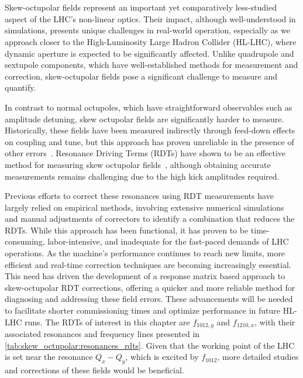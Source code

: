 \section{}

Skew-octupolar fields represent an important yet comparatively less-studied aspect of the LHC's
non-linear optics. Their impact, although well-understood in simulations, presents unique challenges
in real-world operation, especially as we approach closer to the High-Luminosity Large Hadron
Collider (HL-LHC), where dynamic aperture is expected to be significantly affected. Unlike
quadrupole and sextupole components, which have well-established methods for measurement and
correction, skew-octupolar fields pose a significant challenge to measure and quantify.

In contrast to normal octupoles, which have straightforward observables such as amplitude detuning,
skew octupolar fields are significantly harder to measure. Historically, these fields have been
measured indirectly through feed-down effects on coupling and tune, but this approach has proven
unreliable in the presence of other errors~\cite{maclean_new_2019,maclean_first_2015}. Resonance
Driving Terms (RDTs) have shown to be an effective method for measuring skew octupolar
fields~\cite{carlier_nonlinear_2020}, although obtaining accurate measurements remains challenging
due to the high kick amplitudes required.

Previous efforts to correct these resonances using RDT measurements have largely relied on
empirical methods, involving extensive numerical simulations and manual adjustments of correctors to
identify a combination that reduces the RDTs. While this approach has been functional, it has proven
to be time-consuming, labor-intensive, and inadequate for the fast-paced demands of LHC operations.
As the machine's performance continues to reach new limits, more efficient and real-time correction
techniques are becoming increasingly essential.
This need has driven the development of a response matrix based approach to skew-octupolar
RDT corrections, offering a quicker and more reliable method for diagnosing and addressing these
field errors. These advancements will be needed to facilitate shorter commissioning times and
optimize performance in future HL-LHC runs. The RDTs of interest in this chapter are $f_{1012,y}$
and $f_{1210,x}$, with their associated resonances and frequency lines presented in
\cref{tab:skew_octupolar:resonances_rdts}.
Given that the working point of the LHC is set near the resonance $Q_x - Q_y$, which is excited by
$f_{1012}$, more detailed studies and corrections of these fields would be beneficial.

